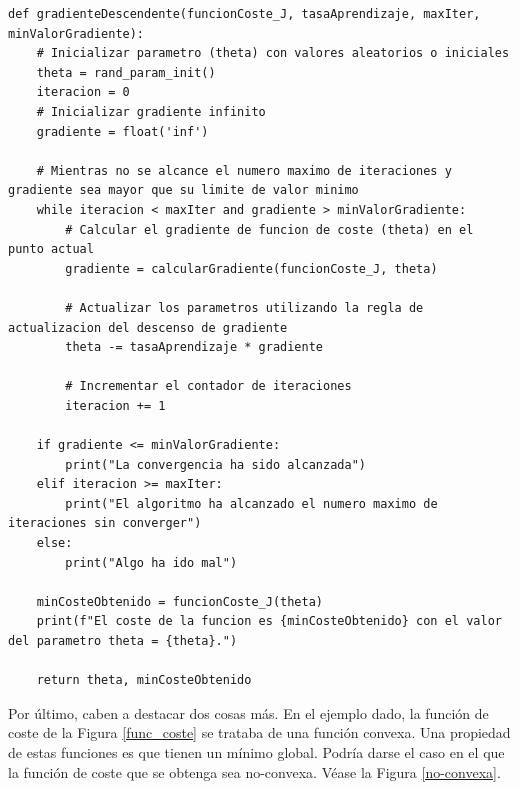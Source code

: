 \begin{lstlisting}[caption={Pseudo-código algoritmo de descenso del gradiente.}]
def gradienteDescendente(funcionCoste_J, tasaAprendizaje, maxIter, minValorGradiente):
    # Inicializar parametro (theta) con valores aleatorios o iniciales
    theta = rand_param_init()
    iteracion = 0
    # Inicializar gradiente infinito
    gradiente = float('inf')
    
    # Mientras no se alcance el numero maximo de iteraciones y gradiente sea mayor que su limite de valor minimo
    while iteracion < maxIter and gradiente > minValorGradiente:
        # Calcular el gradiente de funcion de coste (theta) en el punto actual
        gradiente = calcularGradiente(funcionCoste_J, theta)
        
        # Actualizar los parametros utilizando la regla de actualizacion del descenso de gradiente
        theta -= tasaAprendizaje * gradiente
        
        # Incrementar el contador de iteraciones
        iteracion += 1
        
    if gradiente <= minValorGradiente:
        print("La convergencia ha sido alcanzada")
    elif iteracion >= maxIter:
        print("El algoritmo ha alcanzado el numero maximo de iteraciones sin converger")
    else:
        print("Algo ha ido mal")

    minCosteObtenido = funcionCoste_J(theta)
    print(f"El coste de la funcion es {minCosteObtenido} con el valor del parametro theta = {theta}.")
        
    return theta, minCosteObtenido
\end{lstlisting}

Por último, caben a destacar dos cosas más. En el ejemplo dado, la función de coste de la Figura \ref{func_coste} se trataba de una función convexa. Una propiedad de estas funciones es que  tienen un mínimo global. Podría darse el caso en el que la función de coste que se obtenga sea no-convexa. Véase la Figura \ref{no-convexa}.

